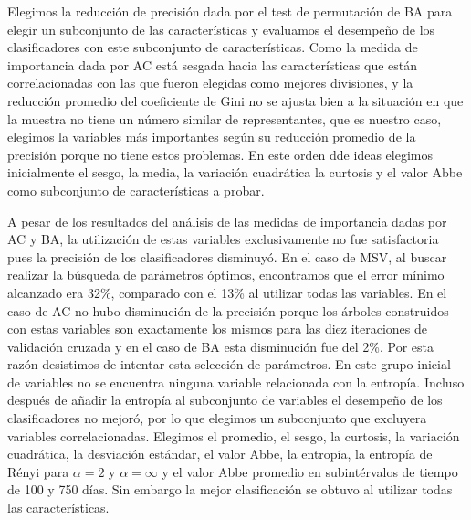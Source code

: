 \documentclass[letterpaper,12pt]{book}
\begin{document}
Elegimos la reducción de precisión dada por el test de permutación de BA para elegir un subconjunto de las características y evaluamos el desempeño de los clasificadores con este subconjunto de características. Como la medida de importancia dada por AC está sesgada hacia las características que están correlacionadas con las que fueron elegidas como mejores divisiones, y la reducción promedio del coeficiente de Gini no se ajusta bien a la situación en que la muestra no tiene un número similar de representantes, que es nuestro caso, elegimos la variables más importantes según su reducción promedio de la precisión porque no tiene estos problemas.  En este orden dde ideas elegimos inicialmente el sesgo, la media, la variación cuadrática la curtosis y el valor Abbe como subconjunto de características a probar.

A pesar de los resultados del análisis de las medidas de importancia dadas por AC y BA, la utilización de estas variables exclusivamente no fue satisfactoria pues la precisión de los clasificadores disminuyó. En el caso de MSV, al buscar realizar la búsqueda de parámetros óptimos, encontramos que el error mínimo alcanzado era 32\%, comparado con el 13\% al utilizar todas las variables. En el caso de AC no hubo disminución de la precisión porque los árboles construidos con estas variables son exactamente los mismos para las diez iteraciones de validación cruzada y en el caso de BA esta disminución fue del 2\%. Por esta razón desistimos de intentar esta selección de parámetros. En este grupo inicial de variables no se encuentra ninguna variable relacionada con la entropía. Incluso después de añadir la entropía al subconjunto de variables el desempeño de los clasificadores no mejoró, por lo que elegimos un subconjunto que excluyera variables correlacionadas. Elegimos el promedio, el sesgo, la curtosis, la variación cuadrática, la desviación estándar, el valor Abbe, la entropía, la entropía de Rényi para $\alpha = 2$ y $\alpha = \infty$ y el valor Abbe promedio en subintérvalos de tiempo de 100 y 750 días. Sin embargo la mejor clasificación se obtuvo al utilizar todas las características.
\end{document}
